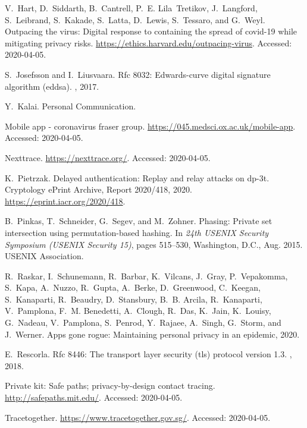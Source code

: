 \documentclass{article}
\begin{document}
\begin{thebibliography}{10}
V.~Hart, D.~Siddarth, B.~Cantrell, P.~E. Lila~Tretikov, J.~Langford,
  S.~Leibrand, S.~Kakade, S.~Latta, D.~Lewis, S.~Tessaro, and G.~Weyl.
\newblock Outpacing the virus: Digital response to containing the spread of
  covid-19 while mitigating privacy risks.
\newblock \url{https://ethics.harvard.edu/outpacing-virus}.
\newblock Accessed: 2020-04-05.

S.~Josefsson and I.~Liusvaara.
\newblock Rfc 8032: Edwards-curve digital signature algorithm (eddsa).
, 2017.

Y.~Kalai.
\newblock Personal Communication.

Mobile app - coronavirus fraser group.
\newblock \url{https://045.medsci.ox.ac.uk/mobile-app}.
\newblock Accessed: 2020-04-05.

Nexttrace.
\newblock \url{https://nexttrace.org/}.
\newblock Accessed: 2020-04-05.

K.~Pietrzak.
\newblock Delayed authentication: Replay and relay attacks on dp-3t.
\newblock Cryptology ePrint Archive, Report 2020/418, 2020.
\newblock \url{https://eprint.iacr.org/2020/418}.

B.~Pinkas, T.~Schneider, G.~Segev, and M.~Zohner.
\newblock Phasing: Private set intersection using permutation-based hashing.
\newblock In {\em 24th {USENIX} Security Symposium ({USENIX} Security 15)},
  pages 515--530, Washington, D.C., Aug. 2015. {USENIX} Association.

R.~Raskar, I.~Schunemann, R.~Barbar, K.~Vilcans, J.~Gray, P.~Vepakomma,
  S.~Kapa, A.~Nuzzo, R.~Gupta, A.~Berke, D.~Greenwood, C.~Keegan, S.~Kanaparti,
  R.~Beaudry, D.~Stansbury, B.~B. Arcila, R.~Kanaparti, V.~Pamplona, F.~M.
  Benedetti, A.~Clough, R.~Das, K.~Jain, K.~Louisy, G.~Nadeau, V.~Pamplona,
  S.~Penrod, Y.~Rajaee, A.~Singh, G.~Storm, and J.~Werner.
\newblock Apps gone rogue: Maintaining personal privacy in an epidemic, 2020.

E.~Rescorla.
\newblock Rfc 8446: The transport layer security (tls) protocol version 1.3.
, 2018.

Private kit: Safe paths; privacy-by-design contact tracing.
\newblock \url{http://safepaths.mit.edu/}.
\newblock Accessed: 2020-04-05.

Tracetogether.
\newblock \url{https://www.tracetogether.gov.sg/}.
\newblock Accessed: 2020-04-05.


\end{thebibliography}
\end{document}
